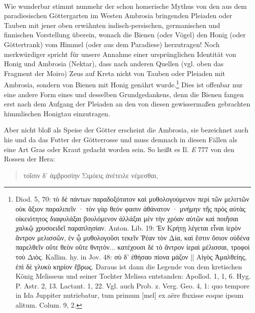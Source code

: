 \documentclass[a4paper, 11pt, oneside]{article}
\begin{document}
\paragraph{}
Wie wunderbar stimmt nunmehr der schon homerische Mythus von den aus dem paradiesischen Göttergarten im Westen Ambrosia bringenden Pleiaden oder Tauben mit jener oben erwähnten indisch-persischen, germanischen und finnischen Vorstellung überein, wonach die Bienen (oder Vögel) den Honig (oder Göttertrank) vom Himmel (oder aus dem Paradiese) herzutragen! Noch merkwürdiger spricht für unsere Annahme einer ursprünglichen Identität von Honig und Ambrosia (Nektar), dass nach anderen Quellen (vgl. oben das Fragment der Moiro) Zeus auf Kreta nicht von Tauben oder Pleiaden mit Ambrosia, sondern von Bienen mit Honig genährt wurde.\footnote{Diod. 5, 70: τὸ δὲ πάντων παραδοξότατον καὶ μυθολογούμενον περὶ τῶν μελιττῶν οὐκ ἄξιον παραλιπεῖν · τὸν γὰρ θεόν φασιν ἀθάνατον · μνήμην τῆς πρὸς αὐτὰς οἰκειότητος διαφυλάξαι βουλόμενον ἀλλάξαι μὲν τὴν χρόαν αὐτῶν καὶ ποιῆσαι χαλκῷ χρυσοειδεῖ παραπλησίαν. Anton. Lib. 19: Ἐν Κρήτῃ λέγεται εἶναι ἱερὸν ἄντρον μελισσῶν, ἐν ᾧ μυθολογοῦσι τεκεῖν Ῥέαν τὸν Δία, καὶ ἔστιν ὅσιον οὐδένα παρελθεῖν οὔτε θεὸν οὔτε θνητόν... κατέχουσι δὲ τὸ ἄντρον ἱεραὶ μέλισσαι, τροφοὶ τοὺ Διὸς. Kallim. hy. in Jov. 48: σὺ δ' ἐθήσαο πίονα μάζον || Αἰγὸς Ἀμαλθείης, ἐπὶ δὲ γλυκὺ κηρίον ἔβρως. Daraus ist dann die Legende von dem kretischen König Melisseus und seiner Tochter Melissa entstanden: Apollod. 1, 1, 6. Hyg. P. Astr. 2, 13. Lactant. 1, 22. Vgl. auch Prob. z. Verg. Geo. 4, 1: quo tempore in Ida Juppiter nutriebatur, tum primum [mel] ex aëre fluxisse eoque ipsum alitum. Colum. 9, 2.} Dies ist offenbar nur eine andere Form eines und desselben Grundgedankens, denn die Bienen fangen erst nach dem Aufgang der Pleiaden an den von diesen gewissermaßen gebrachten himmlischen Honigtau einzutragen.

Aber nicht bloß als Speise der Götter erscheint die Ambrosia, sie bezeichnet auch hie und da das Futter der Götterrosse und muss demnach in diesen Fällen als eine Art Gras oder Kraut gedacht worden sein. So heißt es Il. \emph{E} 777 von den Rossen der Hera:
\begin{quotation}
τοῖσιν δ' ἀμβροσίην Σιμόεις ἀνέτειλε νέμεσθαι,
\end{quotation}
\end{document}

